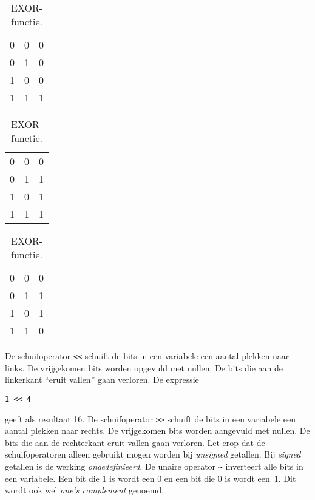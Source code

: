 \begin{table}[!ht]
\centering
\caption{De drie bitsgewijze operatoren.}
\label{tab:driebaisfuncties}
\begin{subtable}[t]{0.333\textwidth}
\centering
\caption{AND-functie.}
\label{tab:enbasisfunctie}
\begin{tabular}{cc|c}
0 & 0 & 0  \\
0 & 1 & 0  \\
1 & 0 & 0  \\
1 & 1 & 1  \\
\end{tabular}
\end{subtable}%
\begin{subtable}[t]{0.333\textwidth}
\centering
\caption{OR-functie.}
\label{tab:ofbasisfunctie}
\begin{tabular}{cc|c}
0 & 0 & 0  \\
0 & 1 & 1  \\
1 & 0 & 1  \\
1 & 1 & 1  \\
\end{tabular}
\end{subtable}%
\begin{subtable}[t]{0.333\textwidth}
\centering
\caption{EXOR-functie.}
\label{tab:exofbasisfunctie}
\begin{tabular}{cc|c}
0 & 0 & 0  \\
0 & 1 & 1  \\
1 & 0 & 1  \\
1 & 1 & 0  \\
\end{tabular}
\end{subtable}
\end{table}

De schuifoperator \texttt{<<} schuift de bits in een variabele een aantal plekken naar links. De vrijgekomen bits worden opgevuld met nullen. De bits die aan de linkerkant ``eruit vallen'' gaan verloren. De expressie

\begin{lstlisting}[style=lstoneline]
1 << 4
\end{lstlisting}

geeft als resultaat 16. De schuifoperator \texttt{>>} schuift de bits in een variabele een aantal plekken naar rechts. De vrijgekomen bits worden aangevuld met nullen. De bits die aan de rechterkant eruit vallen gaan verloren. Let erop dat de schuifoperatoren alleen gebruikt mogen worden bij \textsl{unsigned} getallen. Bij \textsl{signed} getallen is de werking \textsl{ongedefinieerd}. De unaire operator \texttt{\textasciitilde} inverteert alle bits in een variabele. Een bit die 1 is wordt een 0 en een bit die 0 is wordt een~1. Dit wordt ook wel \textsl{one's complement} genoemd.

